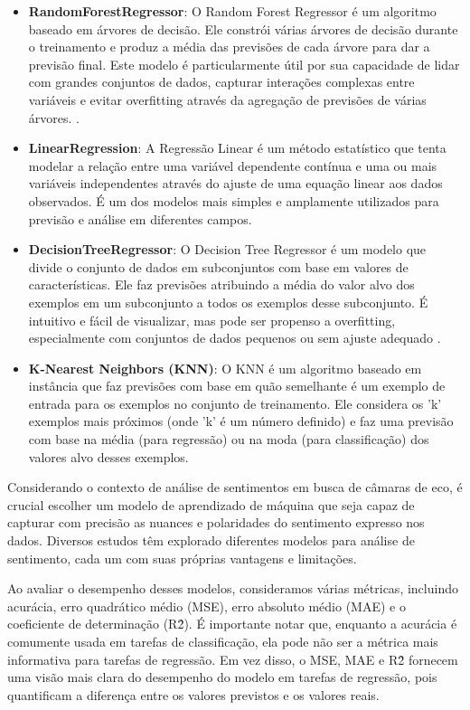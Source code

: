 \begin{itemize}
	\item \textbf{RandomForestRegressor}: O Random Forest Regressor é um algoritmo baseado em árvores de decisão. Ele constrói várias árvores de decisão durante o treinamento e produz a média das previsões de cada árvore para dar a previsão final. Este modelo é particularmente útil por sua capacidade de lidar com grandes conjuntos de dados, capturar interações complexas entre variáveis e evitar overfitting através da agregação de previsões de várias árvores. \cite[5-32]{2001_Breiman}.
	\item \textbf{LinearRegression}: A Regressão Linear é um método estatístico que tenta modelar a relação entre uma variável dependente contínua e uma ou mais variáveis independentes através do ajuste de uma equação linear aos dados observados. É um dos modelos mais simples e amplamente utilizados para previsão e análise em diferentes campos.
	\item \textbf{DecisionTreeRegressor}: O Decision Tree Regressor é um modelo que divide o conjunto de dados em subconjuntos com base em valores de características. Ele faz previsões atribuindo a média do valor alvo dos exemplos em um subconjunto a todos os exemplos desse subconjunto. É intuitivo e fácil de visualizar, mas pode ser propenso a overfitting, especialmente com conjuntos de dados pequenos ou sem ajuste adequado \cite[81-106]{1986_Quinlan}.
	\item \textbf{K-Nearest Neighbors (KNN)}: O KNN é um algoritmo baseado em instância que faz previsões com base em quão semelhante é um exemplo de entrada para os exemplos no conjunto de treinamento. Ele considera os 'k' exemplos mais próximos (onde 'k' é um número definido) e faz uma previsão com base na média (para regressão) ou na moda (para classificação) dos valores alvo desses exemplos.
\end{itemize}

Considerando o contexto de análise de sentimentos em busca de câmaras de eco, é crucial escolher um modelo de aprendizado de máquina que seja capaz de capturar com precisão as nuances e polaridades do sentimento expresso nos dados. Diversos estudos têm explorado diferentes modelos para análise de sentimento, cada um com suas próprias vantagens e limitações.

Ao avaliar o desempenho desses modelos, consideramos várias métricas, incluindo acurácia, erro quadrático médio (MSE), erro absoluto médio (MAE) e o coeficiente de determinação (R\^2). É importante notar que, enquanto a acurácia é comumente usada em tarefas de classificação, ela pode não ser a métrica mais informativa para tarefas de regressão. Em vez disso, o MSE, MAE e R\^2 fornecem uma visão mais clara do desempenho do modelo em tarefas de regressão, pois quantificam a diferença entre os valores previstos e os valores reais.

